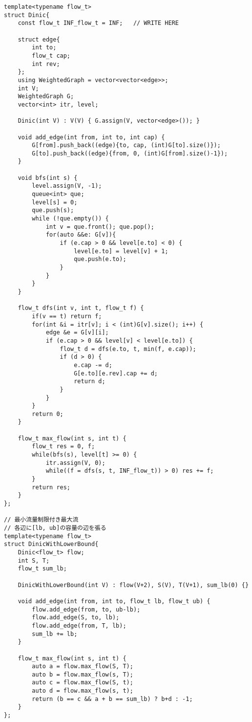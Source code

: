\documentclass[11pt,a4paper]{jsarticle}
\newcommand{\minititle}[1]{\medskip{\large \sf #1}\medskip}
\begin{document}
\minititle{Dinic法(最大流)}
\begin{lstlisting}
template<typename flow_t>
struct Dinic{
    const flow_t INF_flow_t = INF;   // WRITE HERE

    struct edge{
        int to;
        flow_t cap;
        int rev;
    };
    using WeightedGraph = vector<vector<edge>>;
    int V;
    WeightedGraph G;
    vector<int> itr, level;

    Dinic(int V) : V(V) { G.assign(V, vector<edge>()); }

    void add_edge(int from, int to, int cap) {
        G[from].push_back((edge){to, cap, (int)G[to].size()});
        G[to].push_back((edge){from, 0, (int)G[from].size()-1});
    }

    void bfs(int s) {
        level.assign(V, -1);
        queue<int> que;
        level[s] = 0;
        que.push(s);
        while (!que.empty()) {
            int v = que.front(); que.pop();
            for(auto &&e: G[v]){
                if (e.cap > 0 && level[e.to] < 0) {
                    level[e.to] = level[v] + 1;
                    que.push(e.to);
                }
            }
        }
    }

    flow_t dfs(int v, int t, flow_t f) {
        if(v == t) return f;
        for(int &i = itr[v]; i < (int)G[v].size(); i++) {
            edge &e = G[v][i];
            if (e.cap > 0 && level[v] < level[e.to]) {
                flow_t d = dfs(e.to, t, min(f, e.cap));
                if (d > 0) {
                    e.cap -= d;
                    G[e.to][e.rev].cap += d;
                    return d;
                }
            }
        }
        return 0;
    }

    flow_t max_flow(int s, int t) {
        flow_t res = 0, f;
        while(bfs(s), level[t] >= 0) {
            itr.assign(V, 0);
            while((f = dfs(s, t, INF_flow_t)) > 0) res += f;
        }
        return res;
    }
};

// 最小流量制限付き最大流
// 各辺に[lb, ub]の容量の辺を張る
template<typename flow_t>
struct DinicWithLowerBound{
    Dinic<flow_t> flow;
    int S, T;
    flow_t sum_lb;

    DinicWithLowerBound(int V) : flow(V+2), S(V), T(V+1), sum_lb(0) {}

    void add_edge(int from, int to, flow_t lb, flow_t ub) {
        flow.add_edge(from, to, ub-lb);
        flow.add_edge(S, to, lb);
        flow.add_edge(from, T, lb);
        sum_lb += lb;
    }

    flow_t max_flow(int s, int t) {
        auto a = flow.max_flow(S, T);
        auto b = flow.max_flow(s, T);
        auto c = flow.max_flow(S, t);
        auto d = flow.max_flow(s, t);
        return (b == c && a + b == sum_lb) ? b+d : -1;
    }
};
\end{lstlisting}
\end{document}
